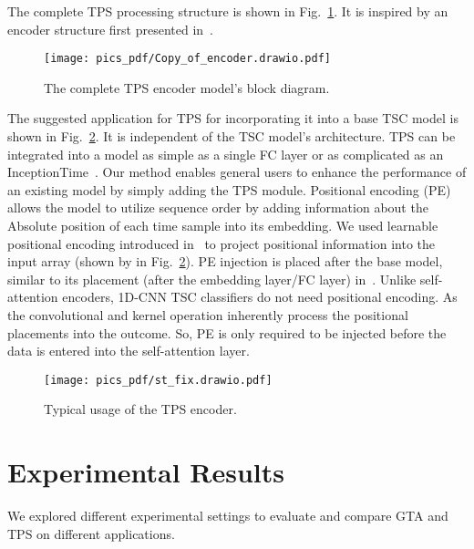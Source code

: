 \documentclass[journal]{IEEEtran}
\begin{document}
The complete TPS processing structure is shown in Fig.~\ref{fig:enc}. It is inspired by an encoder structure first presented in~\cite{vaswani2017attention}. 
\begin{figure}[!t]
\centering
\texttt{[image: pics\_pdf/Copy\_of\_encoder.drawio.pdf]}
\caption{The complete TPS encoder model's block diagram.}
\label{fig:enc}
\end{figure}
The suggested application for TPS for incorporating it into a base TSC model is shown in Fig.~\ref{fig:st}. It is independent of the TSC model's architecture. TPS can be integrated into a model as simple as a single FC layer or as complicated as an InceptionTime~\cite{fawaz2020inceptiontime}. Our method enables general users to enhance the performance of an existing model by simply adding the TPS module. Positional encoding (PE) allows the model to utilize sequence order by adding information about the Absolute position of each time sample into its embedding. We used learnable positional encoding introduced in~\cite{gehring2017convolutional} to project positional information into the input array (shown by  in Fig.~\ref{fig:st}). PE injection is placed after the base model, similar to its placement (after the embedding layer/FC layer) in~\cite{ vaswani2017attention}. Unlike self-attention encoders, 1D-CNN TSC classifiers do not need positional encoding. As the convolutional and kernel operation inherently process the positional placements into the outcome. So, PE is only required to be injected before the data is entered into the self-attention layer.
\begin{figure}[!t]
\centering
\texttt{[image: pics\_pdf/st\_fix.drawio.pdf]}
\caption{Typical usage of the TPS encoder.}
\label{fig:st}
\end{figure}

\section{Experimental Results}
We explored different experimental settings to evaluate and compare GTA and TPS on different applications. 
\end{document}
